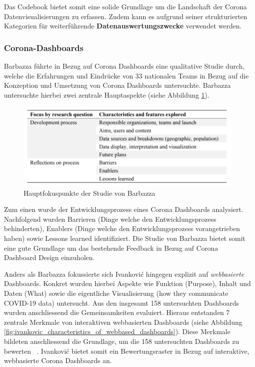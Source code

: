 Das Codebook bietet somit eine solide Grundlage um die Landschaft der Corona Datenvisualisierungen zu erfassen. Zudem kann es aufgrund seiner strukturierten Kategorien für weiterführende \textbf{Datenauswertungszwecke} verwendet werden.   
 
 
\subsubsection{Corona-Dashboards} \label{ch:introduction_corona_dashboards}
Barbazza führte in Bezug auf Corona Dashboards eine qualitative Studie durch, welche die Erfahrungen und Eindrücke von 33 nationalen Teams in Bezug auf die Konzeption und Umsetzung von Corona Dashboards untersuchte. Barbazza untersuchte hierbei zwei zentrale Hauptaspekte (siehe Abbildung \ref{fig:barbazza_method_design}). 


\begin{figure}[h]
    \includegraphics[width=12cm]{images/barbazza_method_design.png}
    \centering
    \caption{Hauptfokuspunkte der Studie von Barbazza ~\citep[S. 4]{barbazza}}
    \label{fig:barbazza_method_design}
\end{figure}

Zum einen wurde der Entwicklungsprozess eines Corona Dashboards analysiert. Nachfolgend wurden Barrieren (Dinge welche den Entwicklungsprozess behinderten), Enablers (Dinge welche den Entwicklungsprozess vorangetrieben haben) sowie Lessons learned identifiziert. Die Studie von Barbazza bietet somit eine gute Grundlage um das bestehende Feedback in Bezug auf Corona Dashboard Design einzuholen.

Anders als Barbazza fokussierte sich Ivankovi{\'c} hingegen explizit auf \textit{webbasierte} Dashboards. Konkret wurden hierbei Aspekte wie Funktion (Purpose), Inhalt und Daten (What) sowie die eigentliche Visualisierung (how they communicate COVID-19 data) untersucht. Aus den insgesamt 158 untersuchten Dashboards wurden anschliessend die Gemeinsamkeiten evaluiert. Hieraus entstanden 7 zentrale Merkmale von interaktiven webbasierten Dashboards (siehe Abbildung \ref{fig:ivankovic_characteristics_of_webbased_dashboards}). Diese Merkmale bildeten anschliessend die Grundlage, um die 158 untersuchten Dashboards zu bewerten ~\citep{ivankovic}. Ivankovi{\'c} bietet somit ein Bewertungsraster in Bezug auf interaktive, webbasierte Corona Dashboards an.


